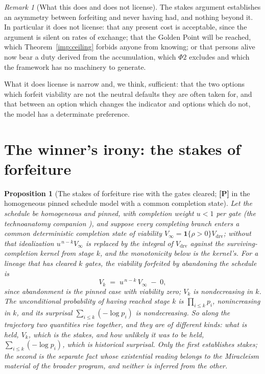 \documentclass[11pt]{article}
\newcommand{\one}{\mathbf{1}}
\theoremstyle{plain}
\newtheorem{proposition}[theorem]{Proposition}
\theoremstyle{definition}
\theoremstyle{remark}
\newtheorem{remark}[theorem]{Remark}
\begin{document}
\begin{remark}[What this does and does not license]\label{hr:rem:stakeslimit}
The stakes argument establishes an asymmetry between forfeiting and
never having had, and nothing beyond it. In particular it does not
license: that any present cost is acceptable, since the argument is
silent on rates of exchange; that the Golden Point will be reached,
which Theorem~\ref{imp:ceiling} forbids anyone from knowing; or that
persons alive now bear a duty derived from the accumulation, which
$\Phi2$ excludes and which the framework has no machinery to generate.

What it does license is narrow and, we think, sufficient: that the two
options which forfeit viability are not the neutral defaults they are
often taken for, and that between an option which changes the indicator
and options which do not, the model has a determinate preference.
\end{remark}


\section{The winner's irony: the stakes of forfeiture}\label{sec:irony}

\begin{proposition}[The stakes of forfeiture rise with the gates cleared;
\textbf{[P]} in the homogeneous pinned schedule model with a common
completion state]\label{hr:rem:monotone}
Let the schedule be homogeneous and pinned, with completion weight
$u<1$ per gate (the technoanatomy companion \cite{TechnoC}), and suppose
every completing branch enters a common deterministic completion state
of viability $V_\infty=\one\{\rho>0\}V_{\mathrm{drv}}$; without that
idealization $u^{\,n-k}V_\infty$ is replaced by the integral of
$V_{\mathrm{drv}}$ against the surviving-completion kernel from stage
$k$, and the monotonicity below is the kernel's. For a lineage that has
cleared $k$ gates, the viability forfeited by abandoning the schedule
is
\begin{equation}\label{hr:eq:optionvalue}
V_k\;=\;u^{\,n-k}\,V_\infty\;-\;0,
\end{equation}
since abandonment is the pinned case with viability zero; $V_k$ is
nondecreasing in $k$. The unconditional probability of having reached
stage $k$ is $\prod_{i\le k}p_i$, nonincreasing in $k$, and its
surprisal $\sum_{i\le k}(-\log p_i)$ is nondecreasing. So along the
trajectory two quantities rise together, and they are of different
kinds: what is held, $V_k$, which is the stakes, and how unlikely it
was to be held, $\sum_{i\le k}(-\log p_i)$, which is historical
surprisal. Only the first establishes stakes; the second is the
separate fact whose existential reading belongs to the Miracleism
material of the broader program, and neither is inferred from the
other.
\end{proposition}
\end{document}
